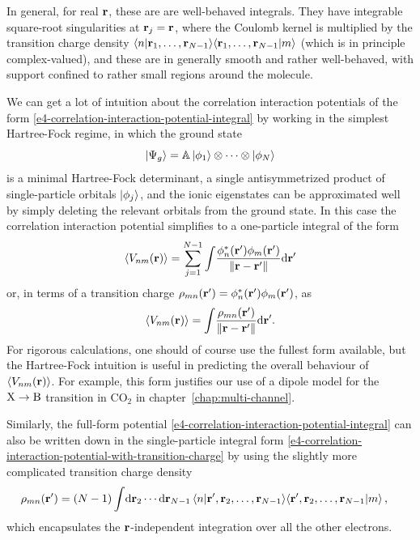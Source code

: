In general, for real $\vb{r}$, these are are well-behaved integrals. They have integrable square-root singularities at $\vb{r}_j=\vb{r}$, where the Coulomb kernel is multiplied by the transition charge density $ \braket{n}{\vb{r}_1,\ldots,\vb{r}_{N-1}} \!  \braket{\vb{r}_1,\ldots,\vb{r}_{N-1}}{m}$ (which is in principle complex-valued), and these are in generally smooth and rather well-behaved, with support confined to rather small regions around the molecule.


We can get a lot of intuition about the correlation interaction potentials of the form \eqref{e4-correlation-interaction-potential-integral} by working in the simplest Hartree-Fock regime, in which the ground state
\begin{equation}
\ket{\Psi_g} = \mathbb{A}\ket{\phi_1}\otimes \cdots\otimes \ket{\phi_N}
\end{equation}
is a minimal Hartree-Fock determinant, a single antisymmetrized product of single-particle orbitals $\ket{\phi_j}$, and the ionic eigenstates can be approximated well by simply deleting the relevant orbitals from the ground state. In this case the correlation interaction potential simplifies to a one-particle integral of the form
\begin{equation}
\left\langle V_{nm}\mathopen{}\left( \vb{r} \right)\mathclose{} \right\rangle
=
\sum_{j=1}^{N-1} 
\int\!
\frac{
  \phi_n^*(\vb{r}')\phi_m(\vb{r}')
  }{
  \| \vb{r} - \vb{r}'\|
  }
\mathrm{d}\vb{r}'
\label{e4-correlation-interaction-potential-hartree-fock}
\end{equation}
or, in terms of a transition charge $\rho_{mn}(\vb{r}') = \phi_n^*(\vb{r}') \phi_m(\vb{r}')$, as 
\begin{equation}
\left\langle V_{nm}\mathopen{}\left( \vb{r} \right)\mathclose{} \right\rangle
=
\int\!
\frac{
  \rho_{mn}(\vb{r}')
  }{
  \| \vb{r} - \vb{r}'\|
  }
\mathrm{d}\vb{r}'
.
\label{e4-correlation-interaction-potential-with-transition-charge}
\end{equation}
For rigorous calculations, one should of course use the fullest form available, but the Hartree-Fock intuition is useful in predicting the overall behaviour of $\left\langle V_{nm}\mathopen{}\left( \vb{r} \right)\mathclose{} \right\rangle$. For example, this form justifies our use of a dipole model for the $\mathrm{X}\to\mathrm{B}$ transition in $\mathrm{CO}_2$ in chapter~\ref{chap:multi-channel}.


Similarly, the full-form potential \eqref{e4-correlation-interaction-potential-integral} can also be written down in the single-particle integral form \eqref{e4-correlation-interaction-potential-with-transition-charge} by using the slightly more complicated transition charge density
\begin{align}
\rho_{mn}(\vb{r}')
 =
(N-1)
\int\!
\mathrm{d}\vb{r}_2 \cdots \mathrm{d}\vb{r}_{N-1} 
&   
\braket{n}{\vb{r}',\vb{r}_2,\ldots,\vb{r}_{N-1}} \!
\braket{\vb{r}',\vb{r}_2,\ldots,\vb{r}_{N-1}}{m}
,
\label{e4-full-transition-charge-as-integral}
\end{align}
which encapsulates the $\vb{r}$-independent integration over all the other electrons.

